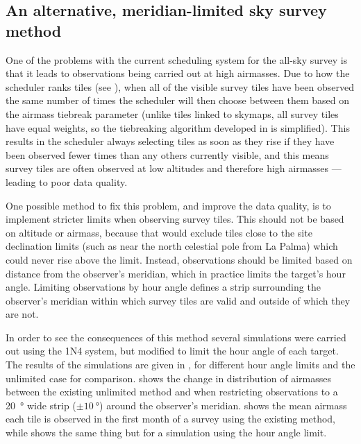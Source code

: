 \subsection{An alternative, meridian-limited sky survey method}
\label{sec:survey_sim_meridian}
\begin{colsection}

One of the problems with the current scheduling system for the all-sky survey is that it leads to observations being carried out at high airmasses. Due to how the scheduler ranks tiles (see ), when all of the visible survey tiles have been observed the same number of times the scheduler will then choose between them based on the airmass tiebreak parameter (unlike tiles linked to skymaps, all survey tiles have equal weights, so the tiebreaking algorithm developed in  is simplified). This results in the scheduler always selecting tiles as soon as they rise if they have been observed fewer times than any others currently visible, and this means survey tiles are often observed at low altitudes and therefore high airmasses --- leading to poor data quality.

One possible method to fix this problem, and improve the data quality, is to implement stricter limits when observing survey tiles. This should not be based on altitude or airmass, because that would exclude tiles close to the site declination limits (such as near the north celestial pole from La Palma) which could never rise above the limit. Instead, observations should be limited based on distance from the observer's meridian, which in practice limits the target's hour angle. Limiting observations by hour angle defines a strip surrounding the observer's meridian within which survey tiles are valid and outside of which they are not.

In order to see the consequences of this method several simulations were carried out using the 1N4 system, but modified to limit the hour angle of each target. The results of the simulations are given in , for different hour angle limits and the unlimited case for comparison.  shows the change in distribution of airmasses between the existing unlimited method and when restricting observations to a \SI{20}{\degree} wide strip ($\pm\SI{10}{\degree}$) around the observer's meridian.  shows the mean airmass each tile is observed in the first month of a survey using the existing method, while  shows the same thing but for a simulation using the hour angle limit.


\end{colsection}

